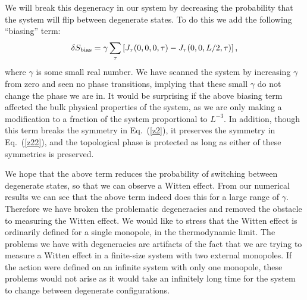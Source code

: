 We will break this degeneracy in our system by decreasing the probability that the system will flip between degenerate states. To do this we add the following ``biasing'' term:
\begin{equation}
\delta S_{\rm bias}=\gamma  \sum_{\tau}\left[J_\tau(0,0,0,\tau)-J_\tau(0,0,L/2,\tau)\right],
\label{bias}
\end{equation}
where $\gamma$ is some small real number. We have scanned the system by increasing $\gamma$ from zero and seen no phase transitions, implying that these small $\gamma$ do not change the phase we are in. It would be surprising if the above biasing term affected the bulk physical properties of the system, as we are only making a modification to a fraction of the system proportional to $L^{-3}$. In addition, though this term breaks the symmetry in Eq.~(\ref{z2}), it preserves the symmetry in Eq.~(\ref{z22}), and the topological phase is protected as long as either of these symmetries is preserved. 

We hope that the above term reduces the probability of switching between degenerate states, so that we can observe a Witten effect. From our numerical results we can see that the above term indeed does this for a large range of $\gamma$. Therefore we have broken the problematic degeneracies and removed the obstacle to measuring the Witten effect. We would like to stress that the Witten effect is ordinarily defined for a single monopole, in the thermodynamic limit. The problems we have with degeneracies are artifacts of the fact that we are trying to measure a Witten effect in a finite-size system with two external monopoles. If the action were defined on an infinite system with only one monopole, these problems would not arise as it would take an infinitely long time for the system to change between degenerate configurations.

